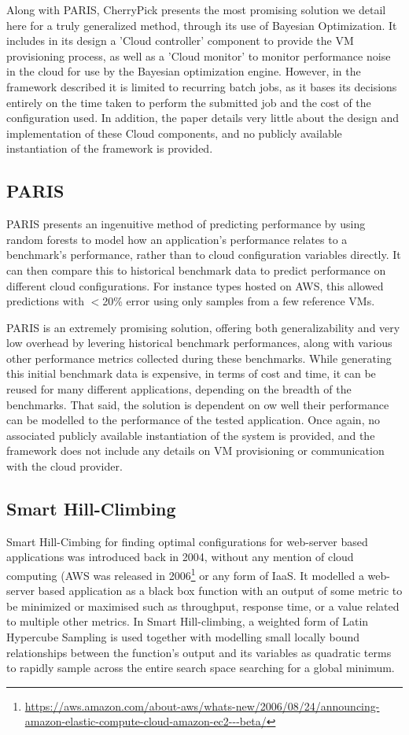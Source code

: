 \documentclass{report}
\begin{document}
Along with PARIS, CherryPick presents the most promising solution we detail here for a truly generalized method, through its use of Bayesian Optimization. It includes in its design a 'Cloud controller' component to provide the VM provisioning process, as well as a 'Cloud monitor' to monitor performance noise in the cloud for use by the Bayesian optimization engine. However, in the framework described it is limited to recurring batch jobs, as it bases its decisions entirely on the time taken to perform the submitted job and the cost of the configuration used. In addition, the paper details very little about the design and implementation of these Cloud components, and no publicly available instantiation of the framework is provided.

\subsection{PARIS}
PARIS \cite{Yadwadkar2017} presents an ingenuitive method of predicting performance by using random forests to model how an application's performance relates to a benchmark's performance, rather than to cloud configuration variables directly. It can then compare this to historical benchmark data to predict performance on different cloud configurations. For instance types hosted on AWS, this allowed predictions with $<$20\% error using only samples from a few reference VMs.

PARIS is an extremely promising solution, offering both generalizability and very low overhead by levering historical benchmark performances, along with various other performance metrics collected during these benchmarks. While generating this initial benchmark data is expensive, in terms of cost and time, it can be reused for many different applications, depending on the breadth of the benchmarks. That said, the solution is dependent on ow well their performance can be modelled to the performance of the tested application. Once again, no associated publicly available instantiation of the system is provided, and the framework does not include any details on VM provisioning or communication with the cloud provider.

\subsection{Smart Hill-Climbing}
Smart Hill-Cimbing for finding optimal configurations for web-server based applications was introduced back in 2004\cite{Xi2004}, without any mention of cloud computing (AWS was released in 2006\footnote{\url{https://aws.amazon.com/about-aws/whats-new/2006/08/24/announcing-amazon-elastic-compute-cloud-amazon-ec2---beta/}} or any form of IaaS. It modelled a web-server based application as a black box function with an output of some metric to be minimized or maximised such as throughput, response time, or a value related to multiple other metrics. In Smart Hill-climbing, a weighted form of Latin Hypercube Sampling\cite{McKay2000} is used together with modelling small locally bound relationships between the function's output and its variables as quadratic terms to rapidly sample across the entire search space searching for a global minimum.
\end{document}
